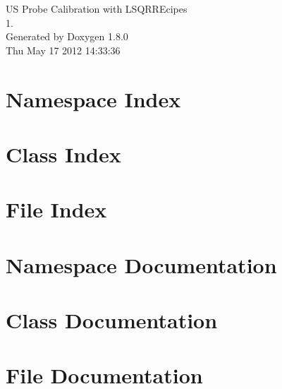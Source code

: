\documentclass{book}
\begin{document}
\hypersetup{pageanchor=false,citecolor=blue}
\begin{titlepage}
\vspace*{7cm}
\begin{center}
{\Large U\-S Probe Calibration with L\-S\-Q\-R\-R\-Ecipes \\[1ex]\large 1. }\\
\vspace*{1cm}
{\large Generated by Doxygen 1.8.0}\\
\vspace*{0.5cm}
{\small Thu May 17 2012 14:33:36}\\
\end{center}
\end{titlepage}
\clearemptydoublepage
{}
\tableofcontents
\clearemptydoublepage
{}
\hypersetup{pageanchor=true,citecolor=blue}
\chapter{Namespace Index}

\chapter{Class Index}

\chapter{File Index}

\chapter{Namespace Documentation}

\chapter{Class Documentation}





\chapter{File Documentation}











\printindex
\end{document}
